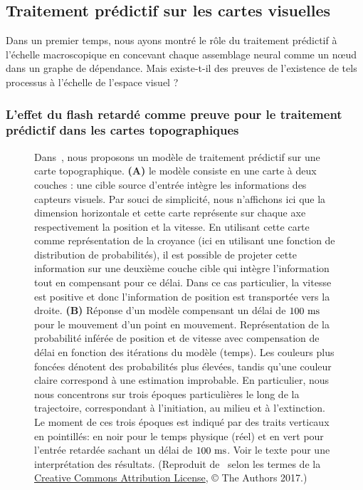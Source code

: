 \subsection{Traitement prédictif sur les cartes visuelles}
\label{sec:maps}
Dans un premier temps, nous ayons montré le rôle du traitement prédictif à l'échelle
macroscopique en concevant chaque assemblage neural comme un nœud dans
un graphe de dépendance. Mais existe-t-il des preuves de l'existence de tels
processus à l'échelle de l'espace visuel ?

\subsubsection{L'effet du flash retardé comme preuve pour le traitement
prédictif dans les cartes
topographiques}
\begin{figure}%
\caption{
Dans~\citep{KhoeiMassonPerrinet17}, nous proposons un
modèle de traitement prédictif sur une carte topographique. \textbf{(A)}
le modèle consiste en une carte à deux couches : une cible source
d'entrée intègre les informations des capteurs visuels. Par souci de
simplicité, nous n'affichons ici que la dimension horizontale et cette
carte représente sur chaque axe respectivement la position et la
vitesse. En utilisant cette carte comme représentation de la croyance
(ici en utilisant une fonction de distribution de probabilités), il est
possible de projeter cette information sur une deuxième couche cible qui
intègre l'information tout en compensant pour ce délai. Dans
ce cas particulier, la vitesse est positive et donc l'information de
position est transportée vers la droite. \textbf{(B)} Réponse d'un
modèle compensant un délai de $100~\si{\milli\second}$ pour le mouvement d'un point en mouvement.
Représentation de la probabilité inférée de position et de vitesse avec
compensation de délai en fonction des itérations du modèle (temps). Les
couleurs plus foncées dénotent des probabilités plus élevées, tandis
qu'une couleur claire correspond à une estimation improbable. En
particulier, nous nous concentrons sur trois époques particulières le
long de la trajectoire, correspondant à l'initiation, au milieu et à l'extinction.
Le moment de ces trois époques est indiqué par des traits
verticaux en pointillés: en noir pour le temps physique (réel) et en
vert pour l'entrée retardée sachant un délai de $100~\si{\milli\second}$. Voir le texte
pour une interprétation des résultats. (Reproduit de~\citep{KhoeiMassonPerrinet17} selon les termes de la
\href{https://journals.plos.org/ploscompbiol/article?id=10.1371/journal.pcbi.1005068}{Creative
Commons Attribution License}, © The Authors 2017.)
}
\label{fig:KhoeiMassonPerrinet17}
\end{figure}

